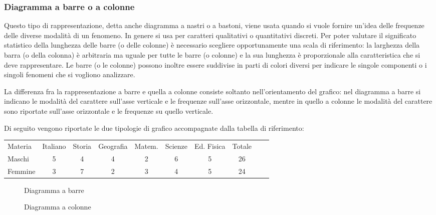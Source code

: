 \subsubsection{Diagramma a barre o a colonne}

Questo tipo di rappresentazione, detta anche diagramma a nastri o a bastoni, viene usata quando si vuole fornire un'idea delle frequenze
delle diverse modalità di un fenomeno. In genere si usa per caratteri qualitativi o quantitativi discreti.
Per poter valutare il significato statistico della lunghezza delle barre (o delle colonne) è necessario scegliere opportunamente una scala di riferimento:
la larghezza della barra (o della colonna) è arbitraria ma uguale per tutte le barre (o colonne) e la sua lunghezza è proporzionale alla caratteristica che si deve rappresentare.
Le barre (o le colonne) possono inoltre essere suddivise in parti di colori diversi per indicare le singole componenti o i singoli fenomeni
che si vogliono analizzare.

La differenza fra la rappresentazione a barre e quella a colonne consiste soltanto
nell'orientamento del grafico: nel diagramma a barre si indicano le modalità del carattere sull'asse verticale e le frequenze sull'asse orizzontale,
mentre in quello a colonne le modalità del carattere sono riportate sull'asse
orizzontale e le frequenze su quello verticale.

Di seguito vengono riportate le due tipologie di grafico accompagnate dalla tabella di riferimento:
\begin{center}
 \begin{tabularx}{.95\textwidth}{X*{7}{c}Xc}
\toprule
Materia& Italiano &Storia & Geografia & Matem. & Scienze & Ed. Fisica & Totale\\
Maschi & 5 & 4& 4 & 2& 6 & 5& 26\\
Femmine & 3 & 7 & 2 & 3  & 4 & 5 & 24\\
\bottomrule
\end{tabularx}
\end{center}

\begin{center}
\begin{figure}[!ht]

\caption{Diagramma a barre}
\end{figure}
\end{center}

\begin{center}
 \begin{figure}[!ht]

\caption{Diagramma a colonne}
\end{figure}
\end{center}

